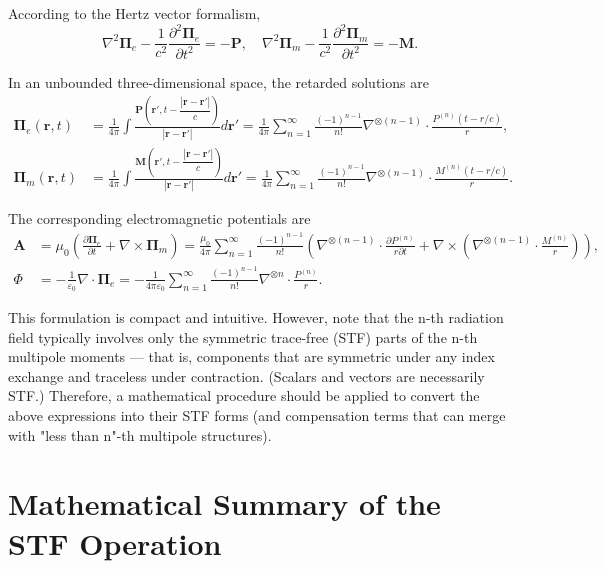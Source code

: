 \documentclass{article}
\begin{document}
	According to the Hertz vector formalism,
	\[
	\nabla^2 \bm{\Pi}_e - \frac{1}{c^2}\frac{\partial^2 \bm{\Pi}_e}{\partial t^2} = -\bm{P}, \quad
	\nabla^2 \bm{\Pi}_m - \frac{1}{c^2}\frac{\partial^2 \bm{\Pi}_m}{\partial t^2} = -\bm{M}.
	\]
	
	In an unbounded three-dimensional space, the retarded solutions are
	\[
	\begin{split}
		\bm{\Pi}_e(\bm{r}, t) &= \frac{1}{4\pi} 
		\int \frac{\bm{P}\!\left( \bm{r}', t - \dfrac{|\bm{r} - \bm{r}'|}{c} \right)}{|\bm{r} - \bm{r}'|} d\bm{r}' 
		= \frac{1}{4\pi} \sum_{n=1}^{\infty} \frac{(-1)^{n-1}}{n!} 
		\nabla^{\otimes (n-1)} \cdot \frac{P^{(n)}(t-r/c)}{r}, \\[4pt]
		\bm{\Pi}_m(\bm{r}, t) &= \frac{1}{4\pi} 
		\int \frac{\bm{M}\!\left( \bm{r}', t - \dfrac{|\bm{r} - \bm{r}'|}{c} \right)}{|\bm{r} - \bm{r}'|} d\bm{r}' 
		= \frac{1}{4\pi} \sum_{n=1}^{\infty} \frac{(-1)^{n-1}}{n!} 
		\nabla^{\otimes (n-1)} \cdot \frac{M^{(n)}(t-r/c)}{r}.
	\end{split}
	\]
	
	The corresponding electromagnetic potentials are
	\[
	\begin{split}
		\bm{A} &= \mu_0 \left( \frac{\partial \bm{\Pi}_e}{\partial t} + \nabla \times \bm{\Pi}_m \right) 
		= \frac{\mu_0}{4\pi} \sum_{n=1}^{\infty} \frac{(-1)^{n-1}}{n!} 
		\left( \nabla^{\otimes (n-1)} \cdot \frac{\partial P^{(n)}}{r \partial t} 
		+ \nabla \times \left( \nabla^{\otimes (n-1)} \cdot \frac{M^{(n)}}{r} \right) \right), \\[4pt]
		\Phi &= -\frac{1}{\varepsilon_0} \nabla \cdot \bm{\Pi}_e 
		= -\frac{1}{4\pi\varepsilon_0} \sum_{n=1}^{\infty} \frac{(-1)^{n-1}}{n!} 
		\nabla^{\otimes n} \cdot \frac{P^{(n)}}{r}.
	\end{split}
	\]
	
	This formulation is compact and intuitive. However, note that the n-th radiation field typically involves only the symmetric trace-free (STF) parts of the n-th multipole moments — that is, components that are symmetric under any index exchange and traceless under contraction. (Scalars and vectors are necessarily STF.) Therefore, a mathematical procedure should be applied to convert the above expressions into their STF forms (and compensation terms that can merge with "less than n"-th multipole structures).
	
	
\section{Mathematical Summary of the STF Operation}
\end{document}
